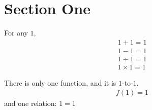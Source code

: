 \setcounter{section}{0}

\section{Section One}
\begin{defn}
  For any $1$,
  \begin{align*}
    1+1=1\\
    1-1=1\\
    1 \div 1=1\\
    1\times 1=1
  \end{align*}
\end{defn}
There is only one function, and it is $1$-to-$1$.
\begin{align*}
  f(1) = 1
\end{align*}
and one relation: $1=1$
